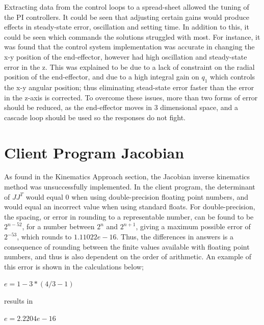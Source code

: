 \documentclass[12pt,openany,a4paper]{book}
\begin{document}
Extracting data from the control loops to a spread-sheet allowed the tuning of the PI controllers. It could be seen that adjusting certain gains would produce effects in steady-state error, oscillation and setting time. In addition to this, it could be seen which commands the solutions struggled with most. For instance, it was found that the control system implementation was accurate in changing the x-y position of the end-effector, however had high oscillation and steady-state error in the z. This was explained to be due to a lack of constraint on the radial position of the end-effector, and due to a high integral gain on $q_1$ which controls the x-y angular position; thus eliminating stead-state error faster than the error in the z-axis is corrected. To overcome these issues, more than two forms of error should be reduced, as the end-effector moves in 3 dimensional space, and a cascade loop should be used so the responses do not fight.


\section{Client Program Jacobian}
As found in the Kinematics Approach section, the Jacobian inverse kinematics method was unsuccessfully implemented. In the client program, the determinant of $JJ^T$ would equal 0 when using double-precision floating point numbers, and would equal an incorrect value when using standard floats. For double-precision, the spacing, or error in rounding to a representable number, can be found to be $2^{n-52}$, for a number between $2^n$ and $2^{n+1}$, giving a maximum possible error of $2^{-53}$, which rounds to $1.11022e-16$. Thus, the differences in answers is a consequence of rounding between the finite values available with floating point numbers, and thus is also dependent on the order of arithmetic. An example of this error is shown in the calculations below;

$e = 1 - 3*(4/3 - 1)$

results in
 
$e =  2.2204e-16$
\end{document}
